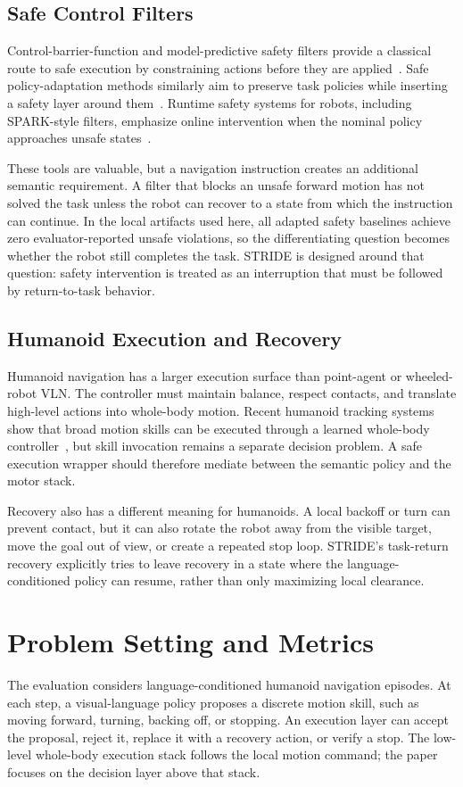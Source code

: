 \documentclass[letterpaper,10pt,conference]{ieeeconf}
\begin{document}
\subsection{Safe Control Filters}
Control-barrier-function and model-predictive safety filters provide a classical route to safe execution by constraining actions before they are applied~\cite{zeng2021mpccbf}. Safe policy-adaptation methods similarly aim to preserve task policies while inserting a safety layer around them~\cite{xiao2023safedpa}. Runtime safety systems for robots, including SPARK-style filters, emphasize online intervention when the nominal policy approaches unsafe states~\cite{sun2025spark}.

These tools are valuable, but a navigation instruction creates an additional semantic requirement. A filter that blocks an unsafe forward motion has not solved the task unless the robot can recover to a state from which the instruction can continue. In the local artifacts used here, all adapted safety baselines achieve zero evaluator-reported unsafe violations, so the differentiating question becomes whether the robot still completes the task. STRIDE is designed around that question: safety intervention is treated as an interruption that must be followed by return-to-task behavior.

\subsection{Humanoid Execution and Recovery}
Humanoid navigation has a larger execution surface than point-agent or wheeled-robot VLN. The controller must maintain balance, respect contacts, and translate high-level actions into whole-body motion. Recent humanoid tracking systems show that broad motion skills can be executed through a learned whole-body controller~\cite{luo2025sonic}, but skill invocation remains a separate decision problem. A safe execution wrapper should therefore mediate between the semantic policy and the motor stack.

Recovery also has a different meaning for humanoids. A local backoff or turn can prevent contact, but it can also rotate the robot away from the visible target, move the goal out of view, or create a repeated stop loop. STRIDE's task-return recovery explicitly tries to leave recovery in a state where the language-conditioned policy can resume, rather than only maximizing local clearance.

\section{Problem Setting and Metrics}
The evaluation considers language-conditioned humanoid navigation episodes. At each step, a visual-language policy proposes a discrete motion skill, such as moving forward, turning, backing off, or stopping. An execution layer can accept the proposal, reject it, replace it with a recovery action, or verify a stop. The low-level whole-body execution stack follows the local motion command; the paper focuses on the decision layer above that stack.
\end{document}
